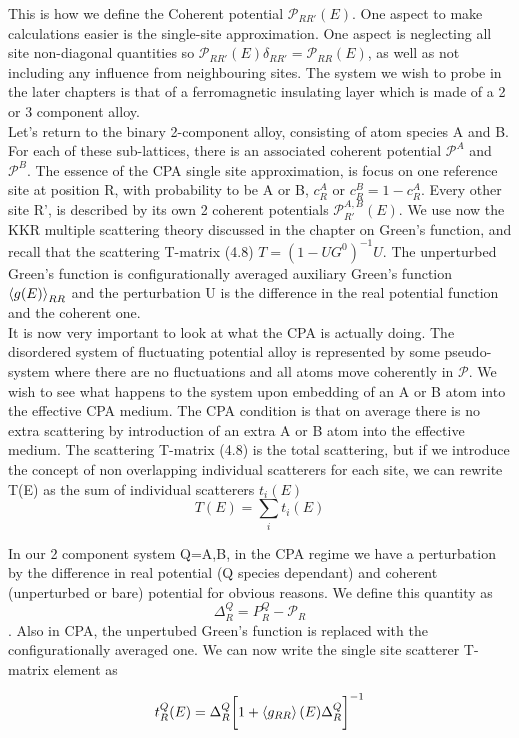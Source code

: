 \documentclass[12pt]{article}
\begin{document}
This is how we define the Coherent potential $\mathcal{P}_{RR'}(E)$. One aspect to make calculations easier is the single-site approximation. One aspect is neglecting all site non-diagonal quantities so $\mathcal{P}_{RR'}(E)\delta_{RR'}=\mathcal{P}_{RR}(E)$, as well as not including any influence from neighbouring sites. The system we wish to probe in the later chapters is that of a ferromagnetic insulating layer which is made of a 2 or 3 component alloy. 
\\Let's return to the binary 2-component alloy, consisting of atom species A and B. For each of these sub-lattices, there is an associated coherent potential $\mathcal{P}^A$ and $\mathcal{P}^B$. The essence of the CPA single site approximation, is focus on one reference site at position R, with probability to be A or B, $c_R^A$ or $c_R^B=1-c_R^A$. Every other site R', is described by its own 2 coherent potentials $\mathcal{P}_{R'}^{A,B}(E)$. We use now the KKR multiple scattering theory discussed in the chapter on Green's function, and recall that the scattering T-matrix (4.8) $T=(1-UG^0)^{-1}U$. The unperturbed Green's function is configurationally averaged auxiliary Green's function $\expval{g(E)}_{RR}$ and the perturbation U is the difference in the real potential function and the coherent one. 
\\
It is now very important to look at what the CPA is actually doing. The disordered system of fluctuating potential alloy is represented by some pseudo-system where there are no fluctuations and all atoms move coherently in $\mathcal{P}$. We wish to see what happens to the system upon embedding of an A or B atom into the effective CPA medium. The CPA condition is that on average there is no extra scattering by introduction of an extra A or B atom into the effective medium. The scattering T-matrix (4.8) is the total scattering, but if we introduce the concept of non overlapping individual scatterers for each site, we can rewrite T(E) as the sum of individual scatterers $t_i(E)$
$$T(E)=\sum_it_i(E)$$

In our 2 component system Q=A,B, in the CPA regime we have a perturbation by the difference in real potential (Q species dependant) and coherent (unperturbed or bare) potential for obvious reasons. We define this quantity as $$\Delta^Q_R=P_R^Q-\mathcal{P}_R$$. Also in CPA, the unpertubed Green's function is replaced with the configurationally averaged one. We can now write the single site scatterer T-matrix element as 

$$t_R^Q(E)=\Delta^Q_R\bigg[1+\expval{g_{RR}}(E)\Delta^Q_R\bigg]^{-1}$$
\end{document}

